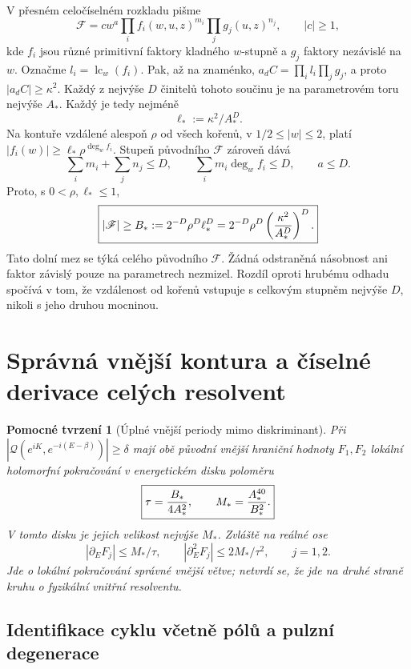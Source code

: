 \documentclass[11pt,a4paper]{article}
\newtheorem{lemma}[theorem]{Pomocné tvrzení}
\theoremstyle{remark}\newtheorem{remark}[theorem]{Poznámka}
\numberwithin{equation}{section}
\begin{document}
V přesném celočíselném rozkladu pišme
\[
\mathscr F=cw^a\prod_i f_i(w,u,z)^{m_i}
\prod_j g_j(u,z)^{n_j},\qquad |c|\ge1,
\]
kde \(f_i\) jsou různé primitivní faktory kladného \(w\)-stupně a \(g_j\) faktory nezávislé na \(w\). Označme \(l_i=\operatorname{lc}_w(f_i)\). Pak, až na znaménko,
\(a_dC=\prod_i l_i\prod_jg_j\), a proto \(|a_dC|\ge\kappa^2\). Každý z nejvýše \(D\) činitelů tohoto součinu je na parametrovém toru nejvýše \(A_*\). Každý je tedy nejméně
\[
\ell_*:=\kappa^2/A_*^D.
\]
Na kontuře vzdálené alespoň \(\rho\) od všech kořenů, v \(1/2\le|w|\le2\), platí
\(|f_i(w)|\ge\ell_*\rho^{\deg_w f_i}\).
Stupeň původního \(\mathscr F\) zároveň dává
\[
\sum_i m_i+\sum_jn_j\le D,\qquad
\sum_i m_i\deg_wf_i\le D,\qquad a\le D.
\]
Proto, s \(0<\rho,\ell_*\le1\),
\begin{equation}
\boxed{|\mathscr F|\ge B_*:=2^{-D}\rho^D\ell_*^D
=2^{-D}\rho^D\left({\kappa^2\over A_*^D}\right)^D.}
\label{eq:rawlower}
\end{equation}
Tato dolní mez se týká celého původního \(\mathscr F\). Žádná odstraněná násobnost ani faktor závislý pouze na parametrech nezmizel. Rozdíl oproti hrubému odhadu spočívá v tom, že vzdálenost od kořenů vstupuje s celkovým stupněm nejvýše \(D\), nikoli s jeho druhou mocninou.

\section{Správná vnější kontura a číselné derivace celých resolvent}
\label{sec:contour}

\begin{lemma}[Úplné vnější periody mimo diskriminant]
Při \(|\mathscr Q(e^{iK},e^{-i(E-\beta)})|\ge\delta\) mají obě původní vnější hraniční hodnoty \(F_1,F_2\) lokální holomorfní pokračování v energetickém disku poloměru
\begin{equation}
\boxed{\tau={B_*\over4A_*^2},\qquad
M_*={A_*^{40}\over B_*^2}.}
\label{eq:tauM}
\end{equation}
V tomto disku je jejich velikost nejvýše \(M_*\). Zvláště na reálné ose
\begin{equation}
|\partial_E F_j|\le M_*/\tau,\qquad
|\partial_E^2 F_j|\le2M_*/\tau^2,\qquad j=1,2.
\label{eq:Fderivatives}
\end{equation}
Jde o lokální pokračování správné vnější větve; netvrdí se, že jde na druhé straně kruhu o fyzikální vnitřní resolventu.
\end{lemma}

\subsection{Identifikace cyklu včetně pólů a pulzní degenerace}
\end{document}
